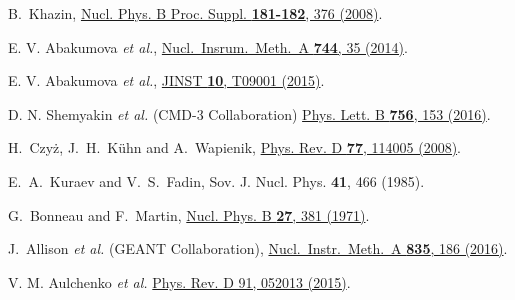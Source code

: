 \documentclass[twocolumn,aps,prd,floatfix,nofootinbib,superscriptaddress]{revtex4-2}
\begin{document}
\begin{thebibliography}{9}
B.~Khazin,
\href{https://doi.org/10.1016/j.nuclphysbps.2008.09.068}
{Nucl. Phys. B Proc. Suppl. \textbf{181-182}, 376 (2008)}.

E. V. Abakumova \emph{et al.},
\href{http://dx.doi.org/10.1134/\-S154747711607044X}
{Nucl.\ Insrum.\ Meth.\ A {\bf 744}, 35 (2014)}.

E. V. Abakumova \emph{et al.},
\href{https://doi.org/10.1088/1748-0221/10/09/T09001}
{JINST \textbf{10}, T09001 (2015)}.

D. N. Shemyakin \emph{et al.} (CMD-3 Collaboration)
\href{https://doi.org/10.1016/j.physletb.2016.02.072}
{Phys. Lett. B \textbf{756}, 153 (2016)}.



H.~Czyż, J.~H.~Kühn and A.~Wapienik,
\href{https://doi.org/10.1103/PhysRevD.77.114005}
{Phys. Rev. D \textbf{77}, 114005 (2008)}.

E.~A.~Kuraev and V.~S.~Fadin,
Sov. J. Nucl. Phys. \textbf{41}, 466 (1985).

G.~Bonneau and F.~Martin,
\href{https://doi.org/10.1016/0550-3213(71)90102-7}
{Nucl. Phys. B \textbf{27}, 381 (1971)}.

J.~Allison {\it et al.} (GEANT Collaboration),
\href{https://doi.org/10.1016/j.nima.2016.06.125}
{Nucl.\ Instr.\ Meth.\ A {\bf 835}, 186 (2016)}.

V. M. Aulchenko \emph{et al.}
\href{https://doi.org/10.1103/PhysRevD.91.052013}
{Phys. Rev. D 91, 052013 (2015)}.


\end{thebibliography}
\end{document}

